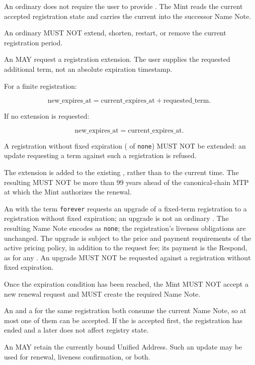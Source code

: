 An ordinary  does not require the user to provide . The Mint reads the current accepted registration state and carries the current  into the successor Name Note.

An ordinary  MUST NOT extend, shorten, restart, or remove the current registration period.

An  MAY request a registration extension. The user supplies the requested additional term, not an absolute expiration timestamp.

For a finite registration:

$$\text{new\_expires\_at} = \text{current\_expires\_at} + \text{requested\_term}.$$

If no extension is requested:

$$\text{new\_expires\_at} = \text{current\_expires\_at}.$$

A registration without fixed expiration ( of \texttt{none}) MUST NOT be extended: an update requesting a term against such a registration is refused.

The extension is added to the existing , rather than to the current time. The resulting  MUST NOT be more than 99 years ahead of the canonical-chain MTP at which the Mint authorizes the renewal.

An  with the term \texttt{forever} requests an upgrade of a fixed-term registration to a registration without fixed expiration; an upgrade is not an ordinary . The resulting Name Note encodes  as \texttt{none}; the registration's liveness obligations are unchanged. The upgrade is subject to the price and payment requirements of the active pricing policy, in addition to the request fee; its payment is the Respond, as for any . An upgrade MUST NOT be requested against a registration without fixed expiration.

Once the expiration condition has been reached, the Mint MUST NOT accept a new renewal request and MUST create the required  Name Note.

An  and a  for the same registration both consume the current Name Note, so at most one of them can be accepted. If the  is accepted first, the registration has ended and a later  does not affect registry state.

An  MAY retain the currently bound Unified Address. Such an update may be used for renewal, liveness confirmation, or both.

